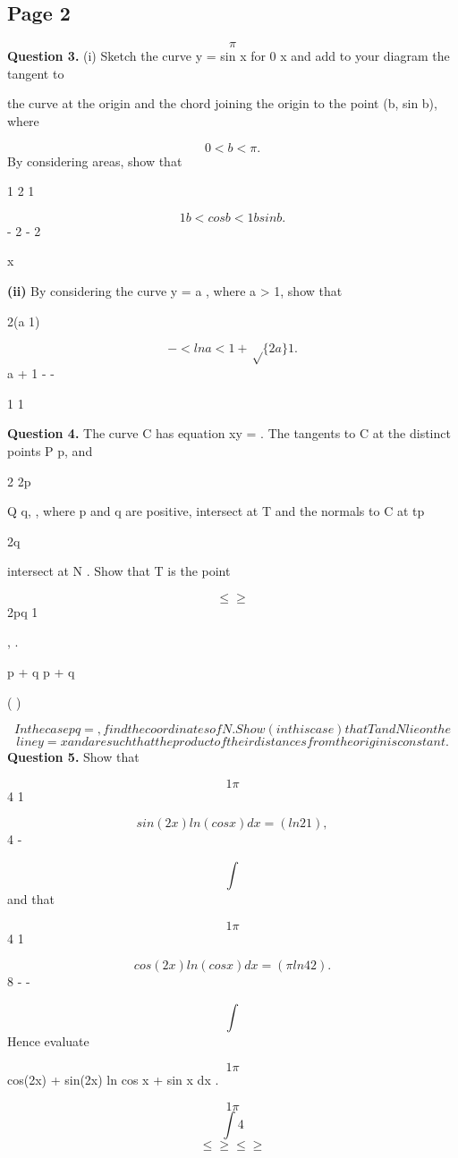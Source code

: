 \documentclass[12pt]{article}
\begin{document}
\subsection*{Page 2}
\begin{flushleft}
\[\pi\]
\bigskip\textbf{Question 3.} (i) Sketch the curve y = sin x for 0 \leq x  \pi and add to your diagram the tangent to\par
the curve at the origin and the chord joining the origin to the point (b, sin b), where\par
\[0 < b < \pi.\]
By considering areas, show that\par
1 2 1\par
\[1 b < cos b < 1 b sin b .\]
- 2 - 2\par
x\par
\textbf{(ii)} By considering the curve y = a , where a > 1, show that\par
2(a 1)\par
\[- < ln a < 1 + \sqrt\{2a\} 1 .\]
a + 1 - -\par
[Hint: You may wish to write a x as e x ln a .]\par
1 1\par
\bigskip\textbf{Question 4.} The curve C has equation xy = . The tangents to C at the distinct points P p, and\par
2 2p\par
Q q, , where p and q are positive, intersect at T and the normals to C at t\leqhese p\geqoints\par
2q\par
intersect at N . Show that T is the point\par
\[\leq \geq\]
2pq 1\par
, .\par
p + q p + q\par
( )\par
\[In the case pq = , find the coordinates of N . Show (in this case) that T and N lie on the\]
\[line y = x and are such that the product of their distances from the origin is constant.\]
\bigskip\textbf{Question 5.} Show that\par
\[1 \pi\]
4 1\par
\[sin(2x) ln(cos x) dx = (ln 2 1) ,\]
4 -\par
\[\int\]
and that\par
\[1 \pi\]
4 1\par
\[cos(2x) ln(cos x) dx = (\pi ln 4 2) .\]
8 - -\par
\[\int\]
Hence evaluate\par
\[1 \pi\]
cos(2x) + sin(2x) ln cos x + sin x dx .\par
\[1 \pi\]
\[\int 4\]
\[\leq \geq \leq \geq\]
\end{flushleft}
\end{document}
